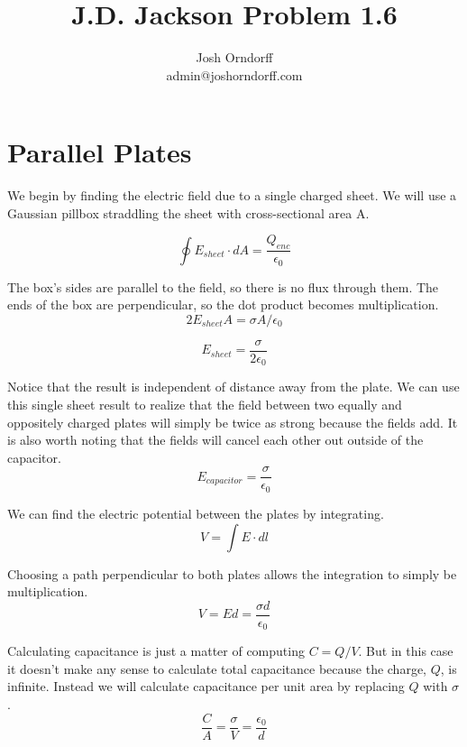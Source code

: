 \documentclass[10pt,a4paper]{article}
\begin{document}
\title{J.D. Jackson Problem 1.6}
\author{Josh Orndorff \\ admin@joshorndorff.com}
\maketitle

\section{Parallel Plates}
We begin by finding the electric field due to a single charged sheet. We will use a Gaussian pillbox straddling the sheet with cross-sectional area A.

\begin{equation}
\oint E_{sheet}\cdot dA = \frac{Q_{enc}}{\epsilon_0}
\end{equation}

The box's sides are parallel to the field, so there is no flux through them. The ends of the box are perpendicular, so the dot product becomes multiplication.
\begin{equation}
2E_{sheet}A = \sigma A / \epsilon_0
\end{equation}

\begin{equation}
E_{sheet}=\frac{\sigma}{2\epsilon_0}
\end{equation}

Notice that the result is independent of distance away from the plate.  We can use this single sheet result to realize that the field between two equally and oppositely charged plates will simply be twice as strong because the fields add. It is also worth noting that the fields will cancel each other out outside of the capacitor.
\begin{equation}
E_{capacitor} = \frac{\sigma}{\epsilon_0}
\end{equation}

We can find the electric potential between the plates by integrating.
\begin{equation}
V=\int E\cdot dl
\end{equation}

Choosing a path perpendicular to both plates allows the integration to simply be multiplication.
\begin{equation}
V=Ed= \frac{\sigma d}{\epsilon_0}
\end{equation}

Calculating capacitance is just a matter of computing $C=Q/V$. But in this case it doesn't make any sense to calculate total capacitance because the charge, $Q$, is infinite. Instead we will calculate capacitance per unit area by replacing $Q$ with $\sigma$.
\begin{equation}\boxed{
\frac{C}{A}=\frac{\sigma}{V} = \frac{\epsilon_0}{d}
}\end{equation}
\end{document}
